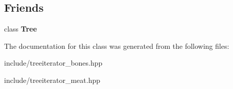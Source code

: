 \subsection*{Friends}
\begin{DoxyCompactItemize}
\item 
\mbox{\label{classTreeIterator_a4b682814d14447120dd184fd300deade}} 
class {\bfseries Tree}
\end{DoxyCompactItemize}


The documentation for this class was generated from the following files\+:\begin{DoxyCompactItemize}
\item 
include/treeiterator\+\_\+bones.\+hpp\item 
include/treeiterator\+\_\+meat.\+hpp\end{DoxyCompactItemize}
